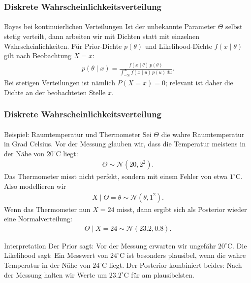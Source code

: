 \documentclass{beamer}
\begin{document}
\begin{frame}[shrink=5]
    \frametitle{Diskrete Wahrscheinlichkeitsverteilung}
\framesubtitle{}

\begin{block}{Bayes bei kontinuierlichen Verteilungen}
Ist der unbekannte Parameter $\Theta$ selbst stetig verteilt, dann arbeiten wir mit Dichten statt mit einzelnen Wahrscheinlichkeiten.
Für Prior-Dichte $p(\theta)$ und Likelihood-Dichte $f(x \mid \theta)$ gilt nach Beobachtung $X=x$:
\begin{align*}
p(\theta \mid x)
= \frac{f(x \mid \theta)\, p(\theta)}{\int_{-\infty}^{\infty} f(x \mid u)\, p(u)\, du}.
\end{align*}
Bei stetigen Verteilungen ist nämlich $P(X=x)=0$; relevant ist daher die Dichte an der beobachteten Stelle $x$.
\end{block}

 \end{frame}


\begin{frame}[shrink=5]
    \frametitle{Diskrete Wahrscheinlichkeitsverteilung}
\framesubtitle{}

\begin{block}{Beispiel: Raumtemperatur und Thermometer}
Sei $\Theta$ die wahre Raumtemperatur in Grad Celsius. Vor der Messung glauben wir, dass die Temperatur meistens in der Nähe von $20^\circ$C liegt:
\begin{align*}
\Theta \sim \mathcal N(20,2^2).
\end{align*}
Das Thermometer misst nicht perfekt, sondern mit einem Fehler von etwa $1^\circ$C. Also modellieren wir
\begin{align*}
X \mid \Theta=\theta \sim \mathcal N(\theta,1^2).
\end{align*}
Wenn das Thermometer nun $X=24$ misst, dann ergibt sich als Posterior wieder eine Normalverteilung:
\begin{align*}
\Theta \mid X=24 \sim \mathcal N(23.2,0.8).
\end{align*}
\end{block}

\begin{block}{Interpretation}
Der Prior sagt: Vor der Messung erwarten wir ungefähr $20^\circ$C.
Die Likelihood sagt: Ein Messwert von $24^\circ$C ist besonders plausibel, wenn die wahre Temperatur in der Nähe von $24^\circ$C liegt.
Der Posterior kombiniert beides: Nach der Messung halten wir Werte um $23.2^\circ$C für am plausibelsten.
\end{block}

 \end{frame}
\end{document}
